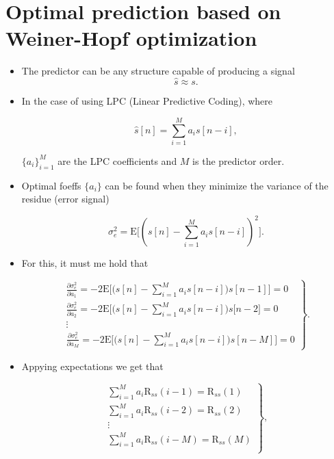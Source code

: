 \section{Optimal prediction based on Weiner-Hopf optimization}
\begin{itemize}
\item
  The predictor can be any structure capable of producing a signal
  \begin{equation}
    \hat{s} \approx s.
  \end{equation}
\item
  In the case of using LPC (Linear Predictive Coding), where

  \begin{equation}
    \hat{s}[n] = \sum_{i=1}^M a_i s[n-i],
  \end{equation}

  \(\{a_i\}_{i=1}^M\) are the LPC coefficients and \(M\) is the
  predictor order.
\item
  Optimal foeffs \(\{a_i\}\) can be found when they minimize the
  variance of the residue (error signal)

  \begin{equation}
    \sigma_e^2 = \text{E}\big[(s[n]-\sum_{i=1}^M a_i s[n-i])^2\big].
  \end{equation}
\item
  For this, it must me hold that

  \begin{equation}
    \left.
      \begin{array}{c}
        \displaystyle\frac{\partial\sigma_e^2}{\partial a_1} = -2\text{E}\Big[\big(s[n]-\displaystyle\sum_{i=1}^M a_i s[n-i]\big)s[n-1]\Big] = 0 \\
        \displaystyle\frac{\partial\sigma_e^2}{\partial a_2} = -2\text{E}\Big[\big(s[n]-\displaystyle\sum_{i=1}^M a_i s[n-i]\big)s[n-2\Big] = 0 \\
        \vdots \\
        \displaystyle\frac{\partial\sigma_e^2}{\partial a_M} = -2\text{E}\Big[\big(s[n]-\displaystyle\sum_{i=1}^M a_i s[n-i]\big)s[n-M]\Big] = 0 
      \end{array}
    \right\rbrace.
  \end{equation}
\item
  Appying expectations we get that
  
  \begin{equation}
    \left.
      \begin{array}{c}
        \displaystyle\sum_{i=1}^M a_i \text{R}_{ss}(i-1) = \text{R}_{ss}(1) \\
        \displaystyle\sum_{i=1}^M a_i \text{R}_{ss}(i-2) = \text{R}_{ss}(2) \\
        \vdots\\
        \displaystyle\sum_{i=1}^M a_i \text{R}_{ss}(i-M) = \text{R}_{ss}(M) \\
      \end{array}
    \right\rbrace,
    \tag{Weiner-Hopf equations}
    \label{Weiner-Hopf equations}
  \end{equation}


\end{itemize}
